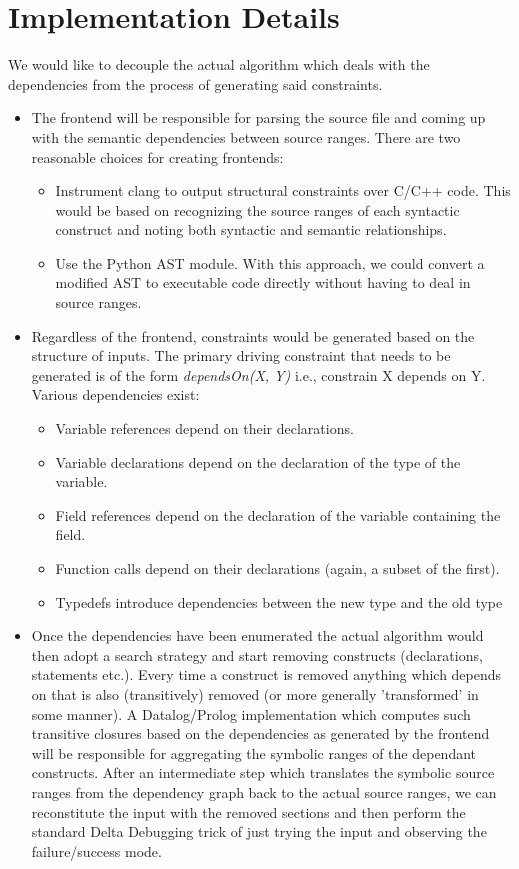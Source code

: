 \documentclass[11pt]{article}
\begin{document}
\section{Implementation Details}
We would like to decouple the actual algorithm which deals with the dependencies
from the process of generating said constraints. 
\begin{itemize}
\item{The frontend will be responsible for parsing the source file and coming up with
the semantic dependencies between source ranges. There are two reasonable
choices for creating frontends:}
\begin{itemize}
\item{Instrument clang to output structural constraints over C/C++ code. This
  would be based on recognizing the source ranges of each syntactic construct
  and noting both syntactic and semantic relationships.}
\item{Use the Python AST module. With this approach, we could convert a modified
  AST to executable code directly without having to deal in source ranges.}
\end{itemize}
\item Regardless of the frontend, constraints would be generated based on the
structure of inputs. The primary driving constraint that needs to be generated
is of the form \emph{dependsOn(X, Y)} i.e., constrain X depends on Y. Various
dependencies exist:
\begin{itemize}
\item{Variable references depend on their declarations.}
\item{Variable declarations depend on the declaration of the type of the variable.}
\item{Field references depend on the declaration of the variable containing the field.}
\item{Function calls depend on their declarations (again, a subset of the first).}
\item{Typedefs introduce dependencies between the new type and the old type}
\end{itemize}

\item Once the dependencies have been enumerated the actual algorithm would then
  adopt a search strategy and start removing constructs (declarations,
  statements etc.). Every time a construct is removed anything which depends on
  that is also (transitively) removed (or more generally 'transformed' in some
  manner). A Datalog/Prolog implementation which computes such transitive
  closures based on the dependencies as generated by the frontend will be
  responsible for aggregating the symbolic ranges of the dependant
  constructs. After an intermediate step which translates the symbolic source
  ranges from the dependency graph back to the actual source ranges, we can
  reconstitute the input with the removed sections and then perform the standard
  Delta Debugging trick of just trying the input and observing the
  failure/success mode.


\end{itemize}
\end{document}
